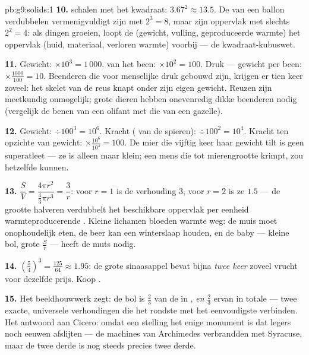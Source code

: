 \begin{solution}{pb:g9:solids:1}
\textbf{10.}  schalen met het kwadraat: $3.67^2 \approx 13.5$. De
 van een ballon verdubbelen vermenigvuldigt zijn  met $2^3 = 8$, maar
zijn oppervlak met slechts $2^2 = 4$: als dingen groeien, loopt de  (gewicht,
vulling, geproduceerde warmte) het oppervlak (huid, materiaal, verloren warmte)
voorbij --- de kwadraat-kubuswet.

\textbf{11.} Gewicht: $\times 10^3 = 1\,000$.  van het been:
$\times 10^2 = 100$. Druk --- gewicht per  been:
$\times \frac{1000}{100} = 10$. Beenderen die voor menselijke druk gebouwd zijn,
krijgen er tien keer zoveel: het skelet van de reus knapt onder zijn eigen gewicht.
Reuzen zijn meetkundig onmogelijk; grote dieren hebben onevenredig dikke beenderen
nodig (vergelijk de benen van een olifant met die van een gazelle).

\textbf{12.} Gewicht: $\div 100^3 = 10^6$. Kracht ( van de spieren):
$\div 100^2 = 10^4$. Kracht ten opzichte van gewicht:
$\times \frac{10^6}{10^4} = 100$. De mier die vijftig keer haar gewicht tilt is
geen superatleet --- ze is alleen maar klein; een mens die tot mierengrootte
krimpt, zou hetzelfde kunnen.

\textbf{13.} $\dfrac{S}{V} = \dfrac{4\pi r^2}{\frac43\pi r^3} = \dfrac{3}{r}$:
voor $r = 1$ is de verhouding $3$, voor $r = 2$ is ze $1.5$ --- de grootte
halveren verdubbelt het beschikbare oppervlak per eenheid warmteproducerende
. Kleine lichamen bloeden warmte weg: de muis moet onophoudelijk eten, de
beer kan een winterslaap houden, en de baby --- kleine bol, grote $\frac Sr$ ---
heeft de muts nodig.

\textbf{14.} $\left(\frac54\right)^3 = \frac{125}{64} \approx 1.95$: de grote
sinaasappel bevat bijna \emph{twee keer} zoveel vrucht voor dezelfde prijs. Koop
.

\textbf{15.} Het beeldhouwwerk zegt: de bol is $\frac23$ van de  in ,
\emph{en} $\frac23$ ervan in totale  --- twee exacte, universele
verhoudingen die het rondste  met het eenvoudigste verbinden. Het antwoord
aan Cicero: omdat een stelling het enige monument is dat legers noch eeuwen
afslijten --- de machines van Archimedes verbrandden met Syracuse, maar de twee
derde is nog steeds precies twee derde.
\end{solution}
